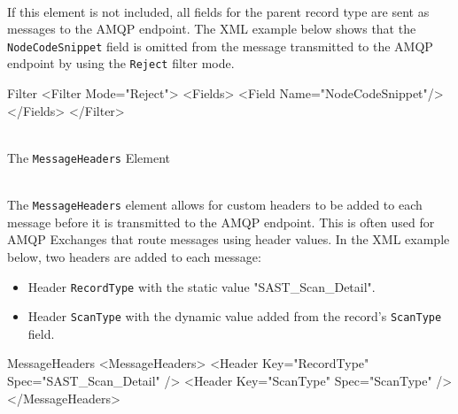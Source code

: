 \noindent\\If this element is not included, all fields for the parent record type are sent as messages to the AMQP endpoint.  The XML example
below shows that the \texttt{NodeCodeSnippet} field is omitted from the message transmitted to the AMQP endpoint by using the \texttt{Reject}
filter mode.

\begin{xml}{Filter}{\expandsenv\contentvariables}{}
<Filter Mode="Reject">
    <Fields>
        <Field Name="NodeCodeSnippet"/>
    </Fields>
</Filter>
\end{xml}
    


\par{\noindent\\The \texttt{MessageHeaders} Element}

\noindent\\The \texttt{MessageHeaders} element allows for custom headers to be added to each message before it is transmitted
to the AMQP endpoint.  This is often used for AMQP Exchanges that route messages using header values.  In the XML example below, 
two headers are added to each message:


\begin{itemize}
    \item Header \texttt{RecordType} with the static value "SAST\_Scan\_Detail".  
    \item Header \texttt{ScanType} with the dynamic value added from the record's \texttt{ScanType} field.  
\end{itemize}


\begin{xml}{MessageHeaders}{\expandsenv\contentvariables}{}
<MessageHeaders>
    <Header Key="RecordType" Spec="SAST_Scan_Detail" />
    <Header Key="ScanType" Spec="{ScanType}" />
</MessageHeaders> 
\end{xml}
